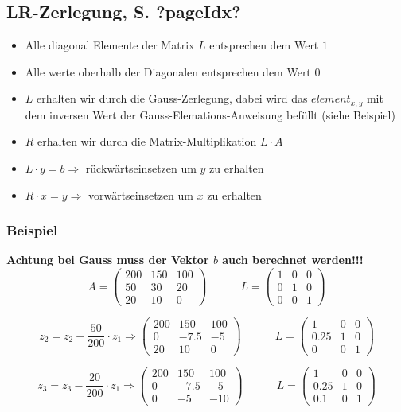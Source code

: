 \subsection{LR-Zerlegung, S. ?pageIdx?}

\begin{itemize}
\item Alle diagonal Elemente der Matrix $L$ entsprechen dem Wert $1$
\item Alle werte oberhalb der Diagonalen entsprechen dem Wert $0$ 
\item $L$ erhalten wir durch die Gauss-Zerlegung, dabei wird das $element_{x,y}$ mit dem inversen Wert der Gauss-Elemations-Anweisung befüllt (siehe Beispiel)
\item $R$ erhalten wir durch die Matrix-Multiplikation $L\cdot A$
\item $L \cdot y = b \Rightarrow $ rückwärtseinsetzen um $y$ zu erhalten
\item $R \cdot x = y \Rightarrow $ vorwärtseinsetzen um $x$ zu erhalten
\end{itemize}

\subsubsection{Beispiel}
\textbf{Achtung bei Gauss muss der Vektor $b$ auch berechnet werden!!!}
\[ A= \left( \begin{array}{ccc}
200 & 150 & 100\\
50 & 30 & 20\\
20 & 10 & 0 \end{array}\right) \quad \quad \quad L= \left( \begin{array}{ccc}
1 & 0 & 0\\
0 & 1 & 0\\
0 & 0 & 1\end{array} \right) \]

\[ z_2 = z_2 - \frac{50}{200} \cdot z_1 \Rightarrow \left( \begin{array}{ccc}
200 & 150 & 100\\
0 & -7.5 & -5\\
20 & 10 & 0 \end{array}\right) \quad \quad \quad L= \left( \begin{array}{ccc}
1 & 0 & 0\\
0.25 & 1 & 0\\
0 & 0 & 1\end{array} \right) \]

\[ z_3 = z_3 - \frac{20}{200} \cdot z_1 \Rightarrow \left( \begin{array}{ccc}
200 & 150 & 100\\
0 & -7.5 & -5\\
0 & -5 & -10 \end{array}\right) \quad \quad \quad L= \left( \begin{array}{ccc}
1 & 0 & 0\\
0.25 & 1 & 0\\
0.1 & 0 & 1\end{array} \right) \]

